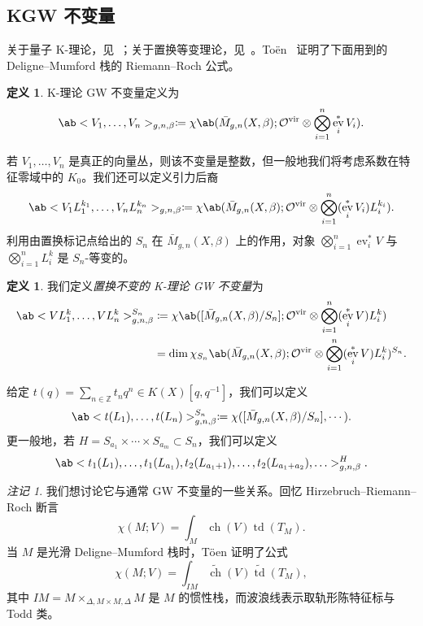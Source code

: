 \documentclass{amsart}
\theoremstyle{definition}
\newtheorem{defn}[thm]{定义}
\theoremstyle{remark}
\newtheorem{rmk}[thm]{注记}
\theoremstyle{plain}
\theoremstyle{definition}
\theoremstyle{remark}
\newcommand{\Z}{\mathbb{Z}}
\newcommand{\mc}[1]{\mathcal{#1}}
\newcommand{\mr}[1]{\mathrm{#1}}
\newcommand{\on}[1]{\operatorname{#1}}
\newcommand{\wt}[1]{\widetilde{#1}}
\newcommand{\1}{\mathbf{1}}
\newcommand{\2}{\mathbf{2}}
\newcommand{\3}{\mathbf{3}}
\newcommand{\vir}{\mr{vir}}
\DeclareMathOperator{\ev}{ev}
\begin{document}
\subsection{KGW 不变量}%
\label{sub:KGW invariants}

关于量子 K-理论，见~\cite{Lee2004}；关于置换等变理论，见~\cite{Givental2017K1,GiventalK7}。To\"en~\cite{Toen1999} 证明了下面用到的 Deligne–Mumford 栈的 Riemann–Roch 公式。

\begin{defn}
    K-理论 GW 不变量定义为
    \[ \ab<V_1, \ldots, V_n>_{g,n,\beta} \coloneqq \chi\ab(\bar{M}_{g,n}(X, \beta); \mc{O}^{\vir} \otimes \bigotimes_{i=1}^n \ev_i^* V_i). \]
\end{defn}

若 \(V_1, \ldots, V_n\) 是真正的向量丛，则该不变量是整数，但一般地我们将考虑系数在特征零域中的 \(K_0\)。我们还可以定义引力后裔
\[ \ab<V_1 L_1^{k_1}, \ldots, V_n L_n^{k_n}>_{g,n,\beta} \coloneqq \chi\ab(\bar{M}_{g,n}(X, \beta); \mc{O}^{\vir} \otimes \bigotimes_{i=1}^n ( \ev_i^* V_i )L_i^{k_i} ). \]
利用由置换标记点给出的 \(S_n\) 在 \(\bar{M}_{g,n}(X, \beta)\) 上的作用，对象 \(\bigotimes_{i=1}^n \ev_i^* V\) 与 \(\bigotimes_{i=1}^n L_i^k\) 是 \(S_n\)-等变的。

\begin{defn}
    我们定义\textit{置换不变的 K-理论 GW 不变量}为
    \begin{align*}
        \ab<V L_1^k, \ldots, V L_n^k>_{g,n,\beta}^{S_n} &\coloneqq \chi\ab([ \bar{M}_{g,n}(X, \beta)/S_n ]; \mc{O}^{\vir} \otimes \bigotimes_{i=1}^n ( \ev_i^* V ) L_i^k) \\
        &= \dim \chi_{S_n} \ab(\bar{M}_{g,n}(X, \beta); \mc{O}^{\vir} \otimes \bigotimes_{i=1}^n ( \ev_i^* V ) L_i^k )^{S_n}.
    \end{align*}
\end{defn}

给定 \(t(q) = \sum_{n \in \Z} t_n q^n \in K(X)[q,q^{-1}]\)，我们可以定义
\[ \ab< t(L_1), \ldots, t(L_n)>^{S_n}_{g,n,\beta} \coloneqq \chi ([\bar{M}_{g,n}(X,\beta)/S_n], \cdots). \]
更一般地，若 \(H = S_{a_1} \times \cdots \times S_{a_m} \subset S_n\)，我们可以定义
\[ \ab<t_1(L_1), \ldots, t_1(L_{a_1}), t_2(L_{a_1+1}), \ldots, t_2(L_{a_1+a_2}), \ldots>_{g,n,\beta}^H. \]

\begin{rmk}
    我们想讨论它与通常 GW 不变量的一些关系。回忆 Hirzebruch–Riemann–Roch 断言
    \[ \chi(M; V) = \int_M \on{ch}(V) \on{td}(T_M). \]
    当 \(M\) 是光滑 Deligne–Mumford 栈时，T\"oen 证明了公式
    \[ \chi(M; V) = \int_{IM} \wt{\on{ch}}(V) \wt{\on{td}}(T_M), \]
    其中 \(IM = M \times_{\Delta, M \times M, \Delta} M\) 是 \(M\) 的惯性栈，而波浪线表示取轨形陈特征标与 Todd 类。
\end{rmk}
\end{document}
